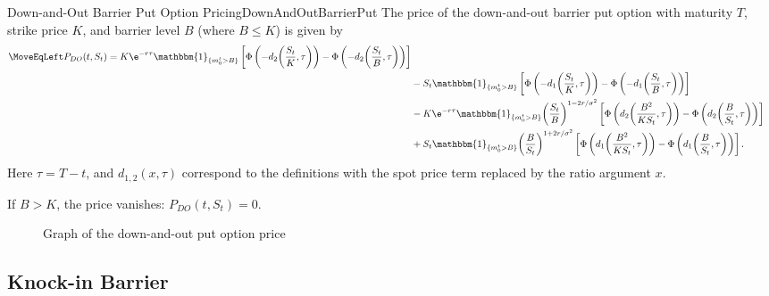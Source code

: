 \begin{prop}{Down-and-Out Barrier Put Option Pricing}{DownAndOutBarrierPut}
	The price of the down-and-out barrier put option with maturity \(T\), strike price \(K\), and barrier level \(B\) (where \(B \le K\)) is given by
	\begin{align}
		\MoveEqLeft P_{DO}(t, S_t) = K \e^{-r\tau} \mathbbm{1}_{\{m_0^t > B\}} \left[ \Phi \left( -d_2 {\left( \frac{S_t}{K}, \tau \right)} \right) - \Phi \left( -d_2 {\left( \frac{S_t}{B}, \tau \right)} \right) \right] \nonumber                        \\
		 & - S_t \mathbbm{1}_{\{m_0^t > B\}} \left[ \Phi \left( -d_1 {\left( \frac{S_t}{K}, \tau \right)} \right) - \Phi \left( -d_1 {\left( \frac{S_t}{B}, \tau \right)} \right) \right] \nonumber                                                          \\
		 & - K \e^{-r\tau} \mathbbm{1}_{\{m_0^t > B\}} {\left( \frac{S_t}{B} \right)}^{1-2r/\sigma^2} \left[ \Phi \left( d_2 {\left( \frac{B^2}{K S_t}, \tau \right)} \right) - \Phi \left( d_2 {\left( \frac{B}{S_t}, \tau \right)} \right) \right] \nonumber \\
		 & + S_t \mathbbm{1}_{\{m_0^t > B\}} {\left( \frac{B}{S_t} \right)}^{1+2r/\sigma^2} \left[ \Phi \left( d_1 {\left( \frac{B^2}{K S_t}, \tau \right)} \right) - \Phi \left( d_1 {\left( \frac{B}{S_t}, \tau \right)} \right) \right].
	\end{align}
	Here \(\tau = T-t\), and \(d_{1,2}(x, \tau)\) correspond to the definitions with the spot price term replaced by the ratio argument \(x\).

	If \(B > K\), the price vanishes: \(P_{DO}(t, S_t) = 0\).
\end{prop}

\begin{figure}[H]
	\centering
	
	\caption{Graph of the down-and-out put option price}\label{fig:downAndOutPutBarrierSurface}
\end{figure}

\clearpage
\subsection{Knock-in Barrier}

